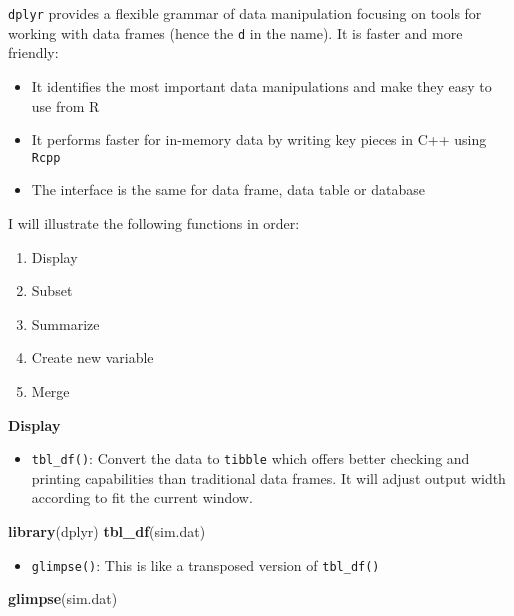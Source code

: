 \documentclass[
]{article}
\newenvironment{Shaded}{\begin{snugshade}}{\end{snugshade}}
\newcommand{\KeywordTok}[1]{\textcolor[rgb]{0.13,0.29,0.53}{\textbf{#1}}}
\newcommand{\NormalTok}[1]{#1}
\providecommand{\tightlist}{%
  \setlength{\itemsep}{0pt}\setlength{\parskip}{0pt}}
\begin{document}
\texttt{dplyr} provides a flexible grammar of data manipulation focusing
on tools for working with data frames (hence the \texttt{d} in the
name). It is faster and more friendly:

\begin{itemize}
\tightlist
\item
  It identifies the most important data manipulations and make they easy
  to use from R
\item
  It performs faster for in-memory data by writing key pieces in C++
  using \texttt{Rcpp}
\item
  The interface is the same for data frame, data table or database
\end{itemize}

I will illustrate the following functions in order:

\begin{enumerate}
\def\labelenumi{\arabic{enumi}.}
\tightlist
\item
  Display
\item
  Subset
\item
  Summarize
\item
  Create new variable
\item
  Merge
\end{enumerate}

\textbf{Display}

\begin{itemize}
\tightlist
\item
  \texttt{tbl\_df()}: Convert the data to \texttt{tibble} which offers
  better checking and printing capabilities than traditional data
  frames. It will adjust output width according to fit the current
  window.
\end{itemize}

\begin{Shaded}
\begin{Highlighting}[]
\KeywordTok{library}\NormalTok{(dplyr)}
\KeywordTok{tbl_df}\NormalTok{(sim.dat)}
\end{Highlighting}
\end{Shaded}

\begin{itemize}
\tightlist
\item
  \texttt{glimpse()}: This is like a transposed version of
  \texttt{tbl\_df()}
\end{itemize}

\begin{Shaded}
\begin{Highlighting}[]
\KeywordTok{glimpse}\NormalTok{(sim.dat)}
\end{Highlighting}
\end{Shaded}
\end{document}
